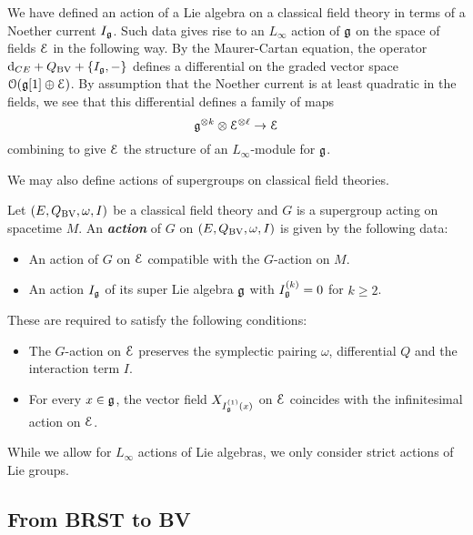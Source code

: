 \documentclass[10pt, oneside]{article}
\newcommand{\defterm}[1]{\textbf{\emph{#1}}}
\begin{document}
\begin{rmk}
We have defined an action of a Lie algebra on a classical field theory in terms of a Noether current $I_\mathfrak g$.
Such data gives rise to an $L_\infty$ action of $\mathfrak g$ on the space of fields $\mathcal E$ in the following way.
By the Maurer-Cartan equation, the operator ${\rm d}_{CE} + Q_{\mathrm{BV}} + \{I_\mathfrak g, -\}$ 
defines a differential on the graded vector space $\mathcal O(\mathfrak g[1] \oplus \mathcal E)$. 
By assumption that the Noether current is at least quadratic in the fields, we see that this differential defines a family of maps
\[
\mathfrak g^{\otimes k} \otimes \mathcal E^{\otimes \ell} \to \mathcal E
\]
combining to give $\mathcal E$ the structure of an $L_\infty$-module for $\mathfrak g$.
\end{rmk}

We may also define actions of supergroups on classical field theories.

\begin{definition}
\label{group_action_def}
Let $(E, Q_{\mathrm{BV}}, \omega, I)$ be a classical field theory and $G$ is a supergroup acting on spacetime $M$. An \defterm{action} of $G$ on $(E, Q_{\mathrm{BV}}, \omega, I)$ is given by the following data:
\begin{itemize}
\item An action of $G$ on $\mathcal E$ compatible with the $G$-action on $M$.

\item An action $I_\mathfrak g$ of its super Lie algebra $\mathfrak g$ with $I^{(k)}_\mathfrak g = 0$ for $k\geq 2$.
\end{itemize}
These are required to satisfy the following conditions:
\begin{itemize}
\item The $G$-action on $\mathcal E$ preserves the symplectic pairing $\omega$, differential $Q$ and the interaction term $I$.

\item For every $x\in\mathfrak g$, the vector field $X_{{I^{(1)}_\mathfrak g}(x)}$ on $\mathcal E$ coincides with the infinitesimal action on $\mathcal E$.
\end{itemize}
\end{definition}

\begin{remark}
While we allow for $L_\infty$ actions of Lie algebras, we only consider strict actions of Lie groups.
\end{remark}

\subsection{From BRST to BV}
\end{document}
